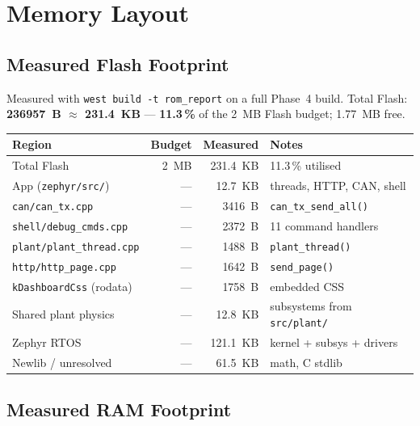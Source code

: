\documentclass[11pt,a4paper]{article}
\begin{document}
\section{Memory Layout}

\subsection{Measured Flash Footprint}

Measured with \texttt{west build -t rom\_report} on a full Phase~4 build.
Total Flash: \textbf{\SI{236957}{B} $\approx$ \SI{231.4}{KB}}
--- \textbf{11.3\,\%} of the \SI{2}{MB} Flash budget; \SI{1.77}{MB} free.

\begin{center}
\begin{tabular}{lrrl}
\toprule
Region & Budget & Measured & Notes \\
\midrule
Total Flash & \SI{2}{MB} & \SI{231.4}{KB} & 11.3\,\% utilised \\
\addlinespace
App (\texttt{zephyr/src/}) & --- & \SI{12.7}{KB} & threads, HTTP, CAN, shell \\
\quad \texttt{can/can\_tx.cpp} & --- & \SI{3416}{B} & \texttt{can\_tx\_send\_all()} \\
\quad \texttt{shell/debug\_cmds.cpp} & --- & \SI{2372}{B} & 11 command handlers \\
\quad \texttt{plant/plant\_thread.cpp} & --- & \SI{1488}{B} & \texttt{plant\_thread()} \\
\quad \texttt{http/http\_page.cpp} & --- & \SI{1642}{B} & \texttt{send\_page()} \\
\quad \texttt{kDashboardCss} (rodata) & --- & \SI{1758}{B} & embedded CSS \\
Shared plant physics & --- & \SI{12.8}{KB} & subsystems from \texttt{src/plant/} \\
Zephyr RTOS & --- & \SI{121.1}{KB} & kernel + subsys + drivers \\
Newlib / unresolved & --- & \SI{61.5}{KB} & math, C stdlib \\
\bottomrule
\end{tabular}
\end{center}

\subsection{Measured RAM Footprint}
\end{document}
